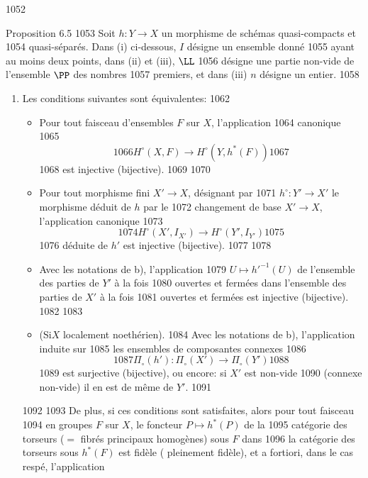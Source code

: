  1052	\begin{enonce*}{Proposition 6.5}
  1053	Soit $h:Y\rightarrow X$ un morphisme de schémas quasi-compacts et
  1054	quasi-séparés. Dans {\rm(i)} ci-dessous, $I$ désigne un ensemble donné
  1055	ayant au moins deux points, dans {\rm(ii)} et {\rm(iii)}, $\LL$
  1056	désigne une partie non-vide de l'ensemble $\PP$ des nombres
  1057	premiers, et dans {\rm(iii)} $n$ désigne un entier.
  1058	\begin{enumerate}
  1059	\renewcommand{\theenumi}{\roman{enumi}}
  1060	\renewcommand{\labelenumi}{(\theenumi)}
  1061	\item Les conditions suivantes sont équivalentes:
  1062	\begin{itemize}
  1063	\item[a)] Pour tout faisceau d'ensembles $F$ sur $X$, l'application
  1064	canonique
  1065	$$
  1066	H^{\circ}(X,F)\longrightarrow H^{\circ}(Y,h^{\ast}(F))
  1067	$$
  1068	est injective (\resp bijective).
  1069	
  1070	\item[b)] Pour tout morphisme fini $X'\rightarrow X$, désignant par
  1071	$h^{\circ}:Y'\rightarrow X'$ le morphisme déduit de $h$ par le
  1072	changement de base $X'\rightarrow X$, l'application canonique
  1073	$$
  1074	H^{\circ}(X', I_{X'})\longrightarrow H^{\circ}(Y',I_{Y'})
  1075	$$
  1076	déduite de $h'$ est injective (\resp bijective).
  1077	
  1078	\item[${\rm b')}$] Avec les notations de {\rm b)}, l'application
  1079	$U\mapsto {h'}^{-1}(U)$ de l'ensemble des parties de $Y'$ à la fois
  1080	ouvertes et fermées dans l'ensemble des parties de $X'$ à la fois
  1081	ouvertes et fermées est injective (\resp bijective).
  1082	
  1083	\item[${\rm b'')}$] (Si\pageoriginale $X$ localement noethérien). 
  1084	Avec les notations de {\rm b)}, l'application induite sur 
  1085	les ensembles de composantes connexes
  1086	$$
  1087	\Pi_{\circ}(h'):\Pi_{\circ}(X')\longrightarrow \Pi_{\circ}(Y')
  1088	$$
  1089	est surjective (\resp bijective), ou encore: si $X'$ est non-vide
  1090	(\resp connexe non-vide) il en est de même de $Y'$.
  1091	\end{itemize}
  1092	
  1093	De plus, si ces conditions sont satisfaites, alors pour tout faisceau
  1094	en groupes $F$ sur $X$, le foncteur $P\mapsto h^{\ast}(P)$ de la
  1095	catégorie des torseurs ($=$ fibrés principaux homogènes) sous $F$ dans
  1096	la catégorie des torseurs sous $h^{\ast}(F)$ est fidèle (	pleinement fidèle), et a fortiori, dans le cas respé, l'application

\end{enumerate}
\end{enonce*}
